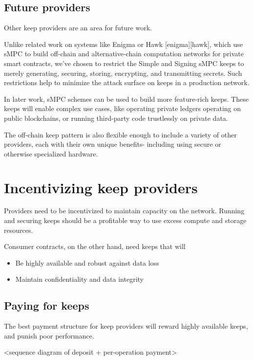 \documentclass[11pt]{article}
\begin{document}
\subsection{Future providers}

Other keep providers are an area for future work.

Unlike related work on systems like Enigma or Hawk [enigma][hawk],
which use sMPC to build  off-chain and alternative-chain computation
networks for private smart contracts, we’ve chosen to restrict the
Simple  and Signing sMPC keeps to merely generating, securing,
storing, encrypting, and transmitting secrets. Such restrictions help
to minimize the attack surface on keeps in a production network.

In later work, sMPC schemes can be used to build more feature-rich
keeps. These keeps will enable complex use cases, like operating
private ledgers operating on public blockchains, or running
third-party code trustlessly on private data.

The off-chain keep pattern is also flexible enough to include a
variety of other providers, each with their own unique benefits-
including using secure or otherwise specialized hardware.


\section{Incentivizing keep providers}

Providers need to be incentivized to maintain capacity on the network.
Running and securing keeps should be a profitable way to use excess
compute and storage resources.

Consumer contracts, on the other hand, need keeps that will

\begin{itemize}
  \item Be highly available and robust against data loss
  \item Maintain confidentiality and data integrity
\end{itemize}

\subsection{Paying for keeps}

The best payment structure for keep providers will reward highly
available keeps, and punish poor performance.

<sequence diagram of deposit + per-operation payment>
\end{document}
